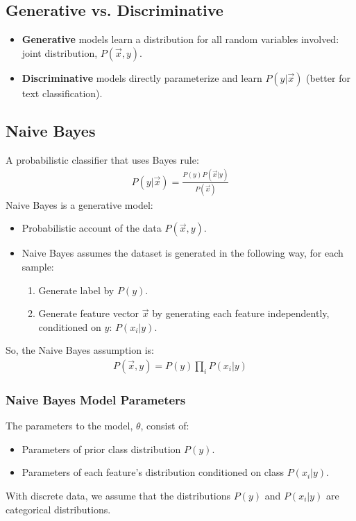 \documentclass{article}
\begin{document}
\subsection{Generative vs. Discriminative}
\begin{itemize}
    \item \textbf{Generative} models learn a distribution for all random variables involved: joint distribution, $P(\vec{x},y)$.
    \item \textbf{Discriminative} models directly parameterize and learn $P(y|\vec{x})$ (better for text classification).
\end{itemize}

\subsection{Naive Bayes}
A probabilistic classifier that uses Bayes rule:
\begin{align}
    P(y | \vec{x}) = \frac{P(y)P(\vec{x}|y)}{P(\vec{x})}
\end{align}
Naive Bayes is a generative model:
\begin{itemize}
    \item Probabilistic account of the data $P(\vec{x},y)$.
    \item Naive Bayes assumes the dataset is generated in the following way, for each sample:
    \begin{enumerate}
        \item Generate label by $P(y)$.
        \item Generate feature vector $\vec{x}$ by generating each feature independently, conditioned on $y$: $P(x_i | y)$.
    \end{enumerate}
\end{itemize}
So, the Naive Bayes assumption is:
\begin{align}
    P(\vec{x}, y) = P(y) \prod_i P(x_i | y)
\end{align}
\subsubsection{Naive Bayes Model Parameters}
The parameters to the model, $\theta$, consist of:
\begin{itemize}
    \item Parameters of prior class distribution $P(y)$.
    \item Parameters of each feature's distribution conditioned on class $P(x_i | y)$.
\end{itemize}
With discrete data, we assume that the distributions $P(y)$ and $P(x_i | y)$ are categorical distributions.
\end{document}
